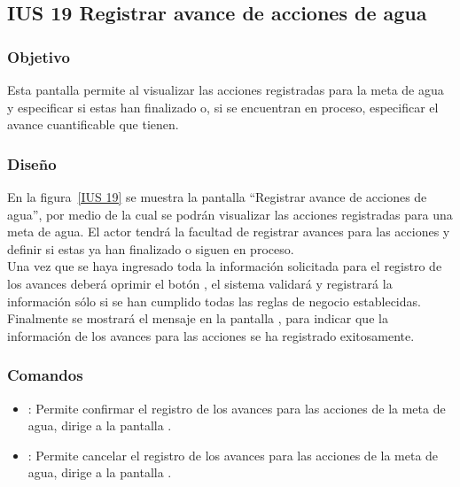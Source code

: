 \subsection{IUS 19 Registrar avance de acciones de agua}

\subsubsection{Objetivo}

    Esta pantalla permite al  visualizar las acciones registradas para la meta de agua y especificar si estas han finalizado o, si se encuentran en proceso, especificar el avance cuantificable que tienen.
    
\subsubsection{Diseño}

        En la figura~\ref{IUS 19} se muestra la pantalla ``Registrar avance de acciones de agua'', por medio de la cual se podrán visualizar las acciones registradas para una meta de agua. El actor tendrá la facultad de registrar avances para las acciones y definir si estas ya han finalizado o siguen en proceso.\\
        
        Una vez que se haya ingresado toda la información solicitada para el registro de los avances deberá oprimir el botón , el sistema validará y registrará la información sólo si se han cumplido todas las reglas de negocio establecidas.\\
    
      Finalmente se mostrará el mensaje  en la pantalla , para indicar que la información de los avances para las acciones se ha registrado exitosamente.
        


\subsubsection{Comandos}
    \begin{itemize}	
	\item {}: Permite confirmar el registro de los avances para las acciones de la meta de agua, dirige a la pantalla .
	\item {}: Permite cancelar el registro de los avances para las acciones de la meta de agua, dirige a la pantalla .
    \end{itemize}

